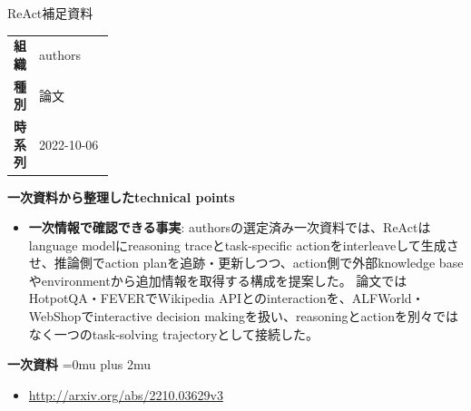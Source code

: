 \begin{technicalnote}{ReAct}{補足資料}
\begingroup
\begin{tabularx}{\linewidth}{@{}>{\bfseries}p{0.22\linewidth}X@{}}
組織 & authors \\
種別 & 論文 \\
時系列 & 2022-10-06 \\
\end{tabularx}
\smallskip
{\bfseries 一次資料から整理したtechnical points}
\begin{itemize}[leftmargin=1.5em,itemsep=0.35em]
\item \textbf{一次情報で確認できる事実}: authorsの選定済み一次資料では、ReActはlanguage modelにreasoning traceとtask-specific actionをinterleaveして生成させ、推論側でaction planを追跡・更新しつつ、action側で外部knowledge baseやenvironmentから追加情報を取得する構成を提案した。 論文ではHotpotQA・FEVERでWikipedia APIとのinteractionを、ALFWorld・WebShopでinteractive decision makingを扱い、reasoningとactionを別々ではなく一つのtask-solving trajectoryとして接続した。
\end{itemize}
\begin{minipage}{\linewidth}
\begin{samepage}
{\bfseries 一次資料}
\begingroup\sloppy
\Urlmuskip=0mu plus 2mu\relax
\begin{itemize}[leftmargin=1.5em,itemsep=0.25em]
\item {\scriptsize\url{http://arxiv.org/abs/2210.03629v3}}
\end{itemize}
\endgroup
\end{samepage}
\end{minipage}
\endgroup
\end{technicalnote}
\medskip

